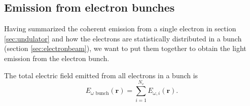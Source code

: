 \documentclass{iucr}              %
\begin{document}
\subsection{Emission from electron bunches}

Having summarized the coherent emission from a single electron in section \ref{sec:undulator} and how the electrons are statistically distributed in a bunch (section \ref{sec:electronbeam}), we want to put them together to obtain the light emission from the electron bunch.

The total electric field emitted from all electrons in a bunch is
\begin{equation}
    E_{\omega \text{~bunch}}(\textbf{r}) = \sum_{i=1}^{N_e} E_{\omega,i}(\textbf{r}).
\end{equation}
\end{document}
